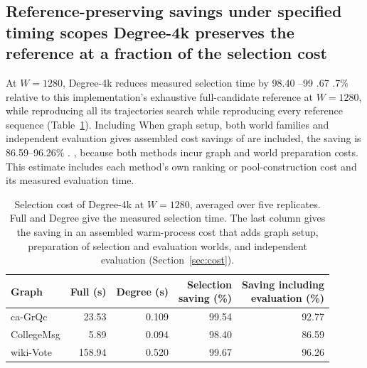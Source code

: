 \documentclass[smallextended]{svjour3}
\newcommand{\CollegeDegreeSaving}{86.59}
\newcommand{\WikiDegreeSaving}{96.26}
\providecommand{\DIFaddtex}[1]{{\protect\color{blue} \sf #1}} %
\providecommand{\DIFdeltex}[1]{{\protect\color{red} \scriptsize #1}} %
\providecommand{\DIFaddbegin}{} %
\providecommand{\DIFaddend}{} %
\providecommand{\DIFdelbegin}{} %
\providecommand{\DIFdelend}{} %
\providecommand{\DIFadd}[1]{\texorpdfstring{\DIFaddtex{#1}}{#1}} %
\providecommand{\DIFdel}[1]{\texorpdfstring{\DIFdeltex{#1}}{}} %
\providecommand{\DIFscaledelfig}{0.5}
\newlength{\DIFdelgraphicswidth} %
\newlength{\DIFdelgraphicsheight} %
\providecommand{\DIFaddincludegraphics}[2][]{{\color{blue}\fbox{\DIFOincludegraphics[#1]{#2}}}} %
\providecommand{\DIFdelincludegraphics}[2][]{%
\sbox{\DIFdelgraphicsbox}{\DIFOincludegraphics[#1]{#2}}%
\settoboxwidth{\DIFdelgraphicswidth}{\DIFdelgraphicsbox} %
\settoboxtotalheight{\DIFdelgraphicsheight}{\DIFdelgraphicsbox} %
\scalebox{\DIFscaledelfig}{%
\parbox[b]{\DIFdelgraphicswidth}{\usebox{\DIFdelgraphicsbox}\\[-\baselineskip] \rule{\DIFdelgraphicswidth}{0em}}\llap{\resizebox{\DIFdelgraphicswidth}{\DIFdelgraphicsheight}{%
\setlength{\unitlength}{\DIFdelgraphicswidth}%
\begin{picture}(1,1)%
\thicklines\linethickness{2pt} %
{\color[rgb]{1,0,0}\put(0,0){\framebox(1,1){}}}%
{\color[rgb]{1,0,0}\put(0,0){\line( 1,1){1}}}%
{\color[rgb]{1,0,0}\put(0,1){\line(1,-1){1}}}%
\end{picture}%
}\hspace*{3pt}}} %
} %
\DeclareRobustCommand{\DIFaddbegin}{\DIFOaddbegin \let\includegraphics\DIFaddincludegraphics} %
\DeclareRobustCommand{\DIFaddend}{\DIFOaddend \let\includegraphics\DIFOincludegraphics} %
\DeclareRobustCommand{\DIFdelbegin}{\DIFOdelbegin \let\includegraphics\DIFdelincludegraphics} %
\DeclareRobustCommand{\DIFdelend}{\DIFOaddend \let\includegraphics\DIFOincludegraphics} %
\begin{document}
\subsection{\DIFdelbegin \DIFdel{Reference-preserving savings under specified timing scopes}\DIFdelend \DIFaddbegin \DIFadd{Degree-4k preserves the reference at a fraction of the selection cost}\DIFaddend }
\DIFaddbegin \DIFadd{At $W=1280$, }\DIFaddend Degree-4k reduces \DIFdelbegin \DIFdel{measured }\DIFdelend selection time by \DIFdelbegin \DIFdel{98.40}\DIFdelend \DIFaddbegin \DIFadd{98.4}\DIFaddend --99\DIFdelbegin \DIFdel{.67}\DIFdelend \DIFaddbegin \DIFadd{.7}\DIFaddend \% relative to \DIFdelbegin \DIFdel{this implementation's }\DIFdelend \DIFaddbegin \DIFadd{exhaustive }\DIFaddend full-candidate \DIFdelbegin \DIFdel{reference at $W=1280$, while reproducing all its trajectories }\DIFdelend \DIFaddbegin \DIFadd{search while reproducing every reference sequence }\DIFaddend (Table~\ref{tab:cost}). \DIFdelbegin \DIFdel{Including }\DIFdelend \DIFaddbegin \DIFadd{When graph }\DIFaddend setup, both world families and independent evaluation \DIFdelbegin \DIFdel{gives assembled cost savings of }\DIFdelend \DIFaddbegin \DIFadd{are included, the saving is }\DIFaddend \CollegeDegreeSaving{}--\WikiDegreeSaving{}\%\DIFdelbegin \DIFdel{.
}\DIFdelend \DIFaddbegin \DIFadd{, because both methods incur graph and world preparation costs. This estimate includes each method's own ranking or pool-construction cost and its measured evaluation time.
}

\DIFaddend \begin{table}[htbp]
\caption{Selection cost of Degree-4k at $W=1280$, averaged over five replicates. Full and Degree give the measured selection time. The last column gives the saving in an assembled warm-process cost that adds graph setup, preparation of selection and evaluation worlds, and independent evaluation (Section~\ref{sec:cost}).}\label{tab:cost}
\begin{tabular}{lrrrr}
\toprule
Graph & Full (s) & Degree (s) & \shortstack{Selection\\saving (\%)} & \shortstack{Saving including\\evaluation (\%)} \\
\midrule
ca-GrQc & 23.53 & 0.109 & 99.54 & 92.77 \\
CollegeMsg & 5.89 & 0.094 & 98.40 & 86.59 \\
wiki-Vote & 158.94 & 0.520 & 99.67 & 96.26 \\
\bottomrule
\end{tabular}
\end{table}
\end{document}

